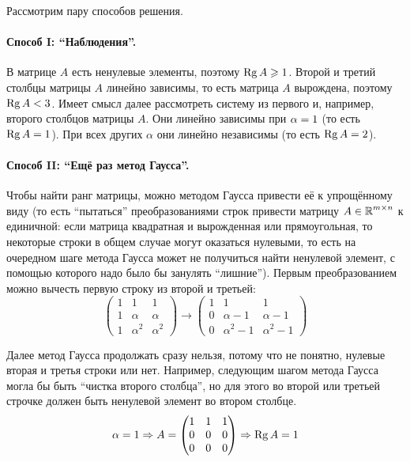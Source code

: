 \documentclass[a4paper,12pt]{article}
\begin{document}
  \begin{solution}
  
    Рассмотрим пару способов решения.
    
    \paragraph{Способ I: ``Наблюдения''.}
    
    В матрице $A$ есть ненулевые элементы, поэтому $\Rg A \hm\geq 1$.
    Второй и третий столбцы матрицы $A$ линейно зависимы, то есть матрица $A$ вырождена, поэтому $\Rg A \hm< 3$.
    Имеет смысл далее рассмотреть систему из первого и, например, второго столбцов матрицы $A$.
    Они линейно зависимы при $\alpha \hm= 1$ (то есть $\Rg A \hm= 1$).
    При всех других $\alpha$ они линейно независимы  (то есть $\Rg A \hm= 2$).
  
    \medskip
    
    \paragraph{Способ II: ``Ещё раз метод Гаусса''.}
    
    Чтобы найти ранг матрицы, можно методом Гаусса привести её к упрощённому виду (то есть ``пытаться'' преобразованиями строк привести матрицу $A \hm\in \RR^{m\times n}$ к единичной: если матрица квадратная и вырожденная или прямоугольная, то некоторые строки в общем случае могут оказаться нулевыми, то есть на очередном шаге метода Гаусса может не получиться найти ненулевой элемент, с помощью которого надо было бы занулять ``лишние'').
    Первым преобразованием можно вычесть первую строку из второй и третьей:
    \[
      \begin{pmatrix}
        1 & 1 & 1\\
        1 & \alpha & \alpha\\
        1 & \alpha^2 & \alpha^2
      \end{pmatrix}
      \longrightarrow
      \begin{pmatrix}
      1 & 1 & 1\\
      0 & \alpha - 1 & \alpha - 1\\
      0 & \alpha^2 - 1 & \alpha^2 - 1
    \end{pmatrix}
    \]
    
    Далее метод Гаусса продолжать сразу нельзя, потому что не понятно, нулевые вторая и третья строки или нет.
    Например, следующим шагом метода Гаусса могла бы быть ``чистка второго столбца'', но для этого во второй или третьей строчке должен быть ненулевой элемент во втором столбце.
    \[
      \alpha = 1 \Rightarrow A = \begin{pmatrix}
        1 & 1 & 1\\
        0 & 0 & 0\\
        0 & 0 & 0
      \end{pmatrix} \Rightarrow \operatorname{Rg} A = 1
    \]
    

\end{solution}
\end{document}
